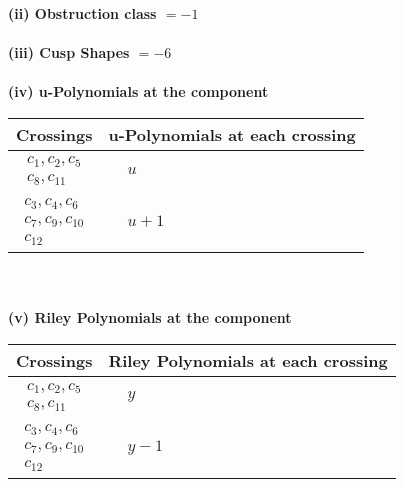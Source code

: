 \documentclass[1p]{elsarticle_modified}
\theoremstyle{definition}
\begin{document}
\flushleft \textbf{(ii) Obstruction class $= -1$}\\~\\
\flushleft \textbf{(iii) Cusp Shapes $= -6$}\\~\\
\newpage\renewcommand{\arraystretch}{1}
\flushleft \textbf{(iv) u-Polynomials at the component}\newline \\
\begin{tabular}{m{50pt}|m{274pt}}
Crossings & \hspace{64pt}u-Polynomials at each crossing \\
\hline $$\begin{aligned}c_{1},c_{2},c_{5}\\c_{8},c_{11}\end{aligned}$$&$\begin{aligned}
&u
\end{aligned}$\\
\hline $$\begin{aligned}c_{3},c_{4},c_{6}\\c_{7},c_{9},c_{10}\\c_{12}\end{aligned}$$&$\begin{aligned}
&u+1
\end{aligned}$\\
\hline
\end{tabular}\\~\\
\newpage\renewcommand{\arraystretch}{1}
\flushleft \textbf{(v) Riley Polynomials at the component}\newline \\
\begin{tabular}{m{50pt}|m{274pt}}
Crossings & \hspace{64pt}Riley Polynomials at each crossing \\
\hline $$\begin{aligned}c_{1},c_{2},c_{5}\\c_{8},c_{11}\end{aligned}$$&$\begin{aligned}
&y
\end{aligned}$\\
\hline $$\begin{aligned}c_{3},c_{4},c_{6}\\c_{7},c_{9},c_{10}\\c_{12}\end{aligned}$$&$\begin{aligned}
&y-1
\end{aligned}$\\
\hline
\end{tabular}\\~\\
\end{document}

